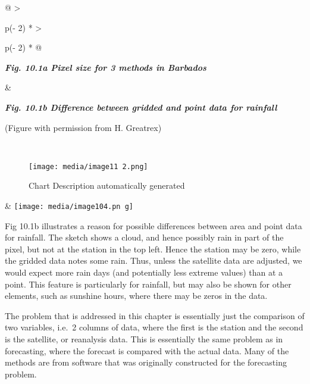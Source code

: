 \documentclass[
  letterpaper,
  DIV=11,
  numbers=noendperiod]{scrreprt}
\begin{document}
\begin{longtable}[]{@{}
  >{\raggedright\arraybackslash}p{(\columnwidth - 2\tabcolsep) * }
  >{\raggedright\arraybackslash}p{(\columnwidth - 2\tabcolsep) * }@{}}
\toprule\noalign{}
\begin{minipage}[b]{\linewidth}\raggedright
\textbf{\emph{Fig. 10.1a Pixel size for 3 methods in Barbados}}
\end{minipage} & \begin{minipage}[b]{\linewidth}\raggedright
\textbf{\emph{Fig. 10.1b Difference between gridded and point data for
rainfall}}

(Figure with permission from H. Greatrex)
\end{minipage} \\
\midrule\noalign{}
\endhead
\bottomrule\noalign{}
\endlastfoot
\begin{minipage}[t]{\linewidth}\raggedright
\begin{figure}[H]

{\centering \texttt{[image: media/image11 2.png]}

}

\caption{Chart Description automatically generated}

\end{figure}%
\end{minipage} &
\texttt{[image: media/image104.pn g]} \\
\end{longtable}

Fig 10.1b illustrates a reason for possible differences between area and
point data for rainfall. The sketch shows a cloud, and hence possibly
rain in part of the pixel, but not at the station in the top left. Hence
the station may be zero, while the gridded data notes some rain. Thus,
unless the satellite data are adjusted, we would expect more rain days
(and potentially less extreme values) than at a point. This feature is
particularly for rainfall, but may also be shown for other elements,
such as sunshine hours, where there may be zeros in the data.

The problem that is addressed in this chapter is essentially just the
comparison of two variables, i.e.~2 columns of data, where the first is
the station and the second is the satellite, or reanalysis data. This is
essentially the same problem as in forecasting, where the forecast is
compared with the actual data. Many of the methods are from software
that was originally constructed for the forecasting problem.
\end{document}
